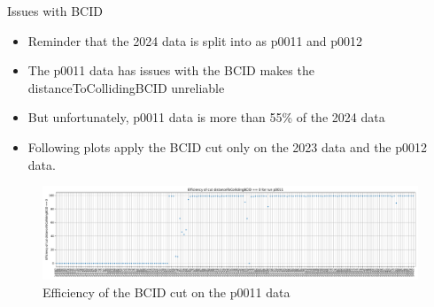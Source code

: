\begin{frame}{Issues with BCID}
	\begin{itemize}
		\item Reminder that the 2024 data is split into as p0011 and p0012
		\item The p0011 data has issues with the BCID makes the distanceToCollidingBCID unreliable
		\item But unfortunately, p0011 data is more than 55\% of the 2024 data
		\item Following plots apply the BCID cut only on the 2023 data and the p0012 data. 
	\end{itemize}
	\begin{figure}
		\includegraphics[width=\linewidth]{./assets/BCIDEfficiency_p0011.pdf}
		\caption{Efficiency of the BCID cut on the p0011 data}
	\end{figure}

\end{frame}

